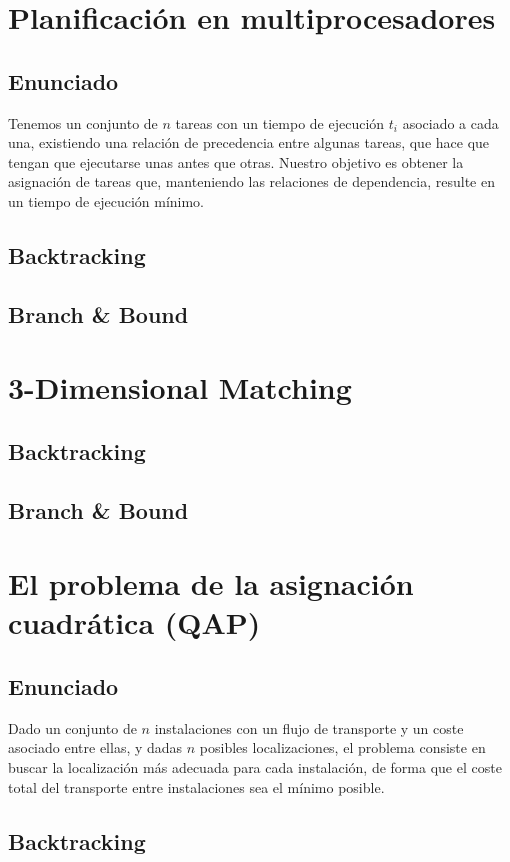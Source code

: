 \documentclass[a4paper, 11pt]{article} %
\begin{document}
\section{Planificación en multiprocesadores}
  \subsection{Enunciado}
  Tenemos un conjunto de $n$ tareas con un tiempo de ejecución $t_i$ asociado a cada una, existiendo una relación de precedencia
  entre algunas tareas, que hace que tengan que ejecutarse unas antes que otras. Nuestro objetivo es obtener la asignación de tareas que, manteniendo las relaciones de dependencia, resulte en un tiempo de ejecución mínimo. 
  
  
  \subsection{Backtracking}
  \subsection{Branch \& Bound}

\section{3-Dimensional Matching}
  \subsection{Backtracking}
  \subsection{Branch \& Bound}

\section{El problema de la asignación cuadrática (QAP)}
  \subsection{Enunciado}
   Dado un conjunto de $n$ instalaciones con un flujo de transporte y un coste asociado entre ellas, y dadas $n$ posibles localizaciones, el problema consiste en buscar la localización más adecuada para cada instalación, de forma que el coste total del transporte entre instalaciones sea el mínimo posible. 

  \subsection{Backtracking}
\end{document}
